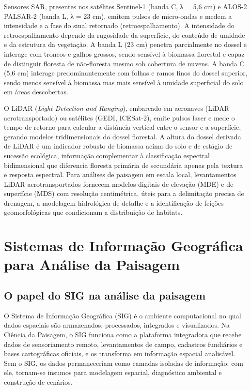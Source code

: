 \documentclass[
  portuguese,
  11pt,
  a4paper,
  open=any]{scrbook}
\begin{document}
Sensores SAR, presentes nos satélites Sentinel-1 (banda C, λ = 5,6 cm) e
ALOS-2 PALSAR-2 (banda L, λ = 23 cm), emitem pulsos de micro-ondas e
medem a intensidade e a fase do sinal retornado (retroespalhamento). A
intensidade do retroespalhamento depende da rugosidade da superfície, do
conteúdo de umidade e da estrutura da vegetação. A banda L (23 cm)
penetra parcialmente no dossel e interage com troncos e galhos grossos,
sendo sensível à biomassa florestal e capaz de distinguir floresta de
não-floresta mesmo sob cobertura de nuvens. A banda C (5,6 cm) interage
predominantemente com folhas e ramos finos do dossel superior, sendo
menos sensível à biomassa mas mais sensível à umidade superficial do
solo em áreas descobertas.

O LiDAR (\emph{Light Detection and Ranging}), embarcado em aeronaves
(LiDAR aerotransportado) ou satélites (GEDI, ICESat-2), emite pulsos
laser e mede o tempo de retorno para calcular a distância vertical entre
o sensor e a superfície, gerando modelos tridimensionais do dossel
florestal. A altura do dossel derivada de LiDAR é um indicador robusto
de biomassa acima do solo e de estágio de sucessão ecológica, informação
complementar à classificação espectral bidimensional que diferencia
floresta primária de secundária apenas pela textura e resposta
espectral. Para análises de paisagem em escala local, levantamentos
LiDAR aerotransportados fornecem modelos digitais de elevação (MDE) e de
superfície (MDS) com resolução centimétrica, úteis para a delimitação
precisa de drenagem, a modelagem hidrológica de detalhe e a
identificação de feições geomorfológicas que condicionam a distribuição
de habitats.

\chapter{Sistemas de Informação Geográfica para Análise da
Paisagem}\label{sec-sig}

\section{O papel do SIG na análise da
paisagem}\label{o-papel-do-sig-na-anuxe1lise-da-paisagem}

O Sistema de Informação Geográfica (SIG) é o ambiente computacional no
qual dados espaciais são armazenados, processados, integrados e
visualizados. Na Ciência da Paisagem, o SIG funciona como a plataforma
integradora que recebe dados de sensoriamento remoto, levantamentos de
campo, cadastros fundiários e bases cartográficas oficiais, e os
transforma em informação espacial analisável. Sem o SIG, os dados
permaneceriam como camadas isoladas de informação; com ele, tornam-se
insumos para modelagem espacial, diagnóstico ambiental e construção de
cenários.
\end{document}
